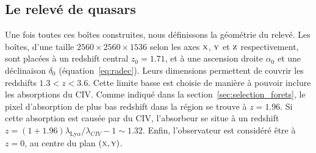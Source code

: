 \subsection{Le relevé de quasars}
\label{subsec:qso}
Une fois toutes ces boîtes construites, nous définissons la géométrie du relevé. Les boîtes, d'une taille $\num{2560}\times\num{2560}\times\num{1536}$ selon les axes $\textsc{x}$, $\textsc{y}$ et $\textsc{z}$ respectivement, sont placées à un redshift central $z_0 = \num{1.71}$, et à une ascension droite $\alpha_0$ et une déclinaison $\delta_0$ (équation~\ref{eq:radec}). Leurs dimensions permettent de couvrir les redshifts $\num{1.3} < z < \num{3.6}$.
Cette limite basse est choisie de manière à pouvoir inclure les absorptions du CIV. Comme indiqué dans la section~\ref{sec:selection_forets}, le pixel d'absorption de plus bas redshift dans la région \lya{}  se trouve à $z = \num{1.96}$. Si cette absorption est causée par du CIV, l'absorbeur se situe à un redshift $z = (1+\num{1.96}) \lambda_{\mathrm{Ly}\alpha} / \lambda_{CIV} - 1 \sim \num{1.32}$.
Enfin, l'observateur est considéré être à $z=0$, au centre du plan $(\textsc{x},\textsc{y})$.


